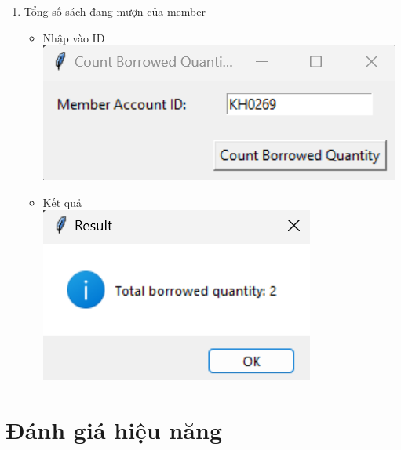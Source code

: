 \documentclass[12pt]{article}
\begin{document}
\begin{enumerate}
    \item Tổng số sách đang mượn của member
\begin{itemize}
    \item Nhập vào ID\\
\includegraphics[width=0.4\linewidth]{gui5.png}
\item Kết quả\\
\includegraphics[width=0.3\linewidth]{gui6.png}
\end{itemize}

\end{enumerate}

\section{Đánh giá hiệu năng}
\end{document}

